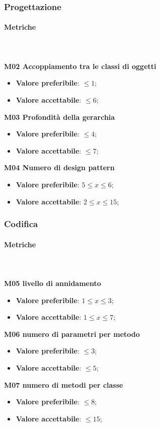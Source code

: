 		\subsubsection{Progettazione} 
			\paragraph{Metriche} \mbox{} \\ \\
				\textbf{M02 Accoppiamento tra le classi di oggetti} 
				\begin{itemize}
					\item \textbf{Valore preferibile}: $\le 1$;
					\item \textbf{Valore accettabile}: $\le 6$;
				\end{itemize}
				\textbf{M03 Profondità della gerarchia} 
				\begin{itemize}
					\item \textbf{Valore preferibile}: $\le 4$;
					\item \textbf{Valore accettabile}: $\le 7$;
				\end{itemize}			
				\textbf{M04 Numero di design pattern} 
				\begin{itemize}
					\item \textbf{Valore preferibile}: $5 \le x \le 6$; 
					\item \textbf{Valore accettabile}: $2 \le x \le 15$; 
				\end{itemize}
			
			\subsubsection{Codifica} 
			\paragraph{Metriche} \mbox{} \\ \\
			\textbf{M05 livello di annidamento} 
			\begin{itemize}
				\item \textbf{Valore preferibile}: $1 \le x \le 3$; 
				\item \textbf{Valore accettabile}: $1 \le x \le 7$; 
			\end{itemize}
			\textbf{M06 numero di parametri per metodo} 
			\begin{itemize}
				\item \textbf{Valore preferibile}: $ \le 3$;
				\item \textbf{Valore accettabile}: $ \le 5$;
			\end{itemize}			
			\textbf{M07 numero di metodi per classe} 
			\begin{itemize}
				\item \textbf{Valore preferibile}: $ \le 8$;
				\item \textbf{Valore accettabile}: $ \le 15$;
			\end{itemize}
	
